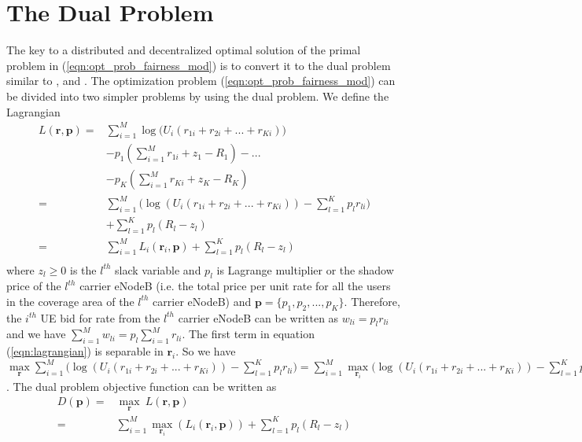 \documentclass[journal]{IEEEtran} 		\usepackage{amsmath,amssymb}
\begin{document}
\section{The Dual Problem}\label{sec:Dual}

The key to a distributed and decentralized optimal solution of the primal problem in (\ref{eqn:opt_prob_fairness_mod}) is to convert it to the dual problem similar to \cite{Ahmed_Utility1}, \cite{kelly98ratecontrol} and \cite{Low99optimizationflow}. The optimization problem (\ref{eqn:opt_prob_fairness_mod}) can be divided into two simpler problems by using the dual problem.  We define the Lagrangian
\begin{equation}\label{eqn:lagrangian}
\begin{aligned}
L(\textbf{r},\textbf{p}) = & \sum_{i=1}^{M}\log \Big(U_i(r_{1i} + r_{2i} + ... + r_{Ki})\Big)\\
		   & -p_1(\sum_{i=1}^{M}r_{1i} + z_1 - R_1) - ...\\
		   & - p_K(\sum_{i=1}^{M}r_{Ki} + z_K - R_K)\\
                = &  \sum_{i=1}^{M}\Big({\log(U_i(r_{1i} + r_{2i} + ... + r_{Ki}))-\sum_{l=1}^{K}p_lr_{li}\Big)}\\
                  & + \sum_{l=1}^{K} p_l(R_l-z_l)\\
                = &  \sum_{i=1}^{M}L_i(\textbf{r}_i,\textbf{p}) + \sum_{l=1}^{K} p_l(R_l-z_l)\\
\end{aligned}
\end{equation}
where $z_l\geq 0$ is the $l^{th}$ slack variable and $p_l$ is Lagrange multiplier or the shadow price of the $l^{th}$ carrier eNodeB (i.e. the total price per unit rate for all the users in the coverage area of the $l^{th}$ carrier eNodeB) and $\textbf{p}=\{p_1,p_2,...,p_K\}$. Therefore, the $i^{th}$ UE bid for rate from the $l^{th}$ carrier eNodeB can be written as $w_{li} = p_l r_{li}$ and we have $\sum_{i=1}^{M}w_{li} = p_l \sum_{i=1}^{M}r_{li}$. The first term in equation (\ref{eqn:lagrangian}) is separable in $\textbf{r}_i$. So we have $\underset{\textbf{r}}\max \sum_{i=1}^{M}({\log(U_i(r_{1i}+r_{2i}+...+r_{Ki}))-\sum_{l=1}^{K}p_lr_{li})} = \sum_{i=1}^{M}\underset{{\textbf{r}_i}}\max\big({\log(U_i(r_{1i}+r_{2i}+...+r_{Ki}))-\sum_{l=1}^{K}p_lr_{li}\big)}$.
The dual problem objective function can be written as
\begin{equation}\label{eqn:dual_obj_fn}
\begin{aligned}
D(\textbf{p}) = & \underset{{\textbf{r}}}\max \:L(\textbf{r},\textbf{p}) \\
= &\sum_{i=1}^{M}\underset{{\textbf{r}_i}}\max (L_i(\textbf{r}_i,\textbf{p})) + \sum_{l=1}^{K} p_l(R_l-z_l)
\end{aligned}
\end{equation}
\end{document}
